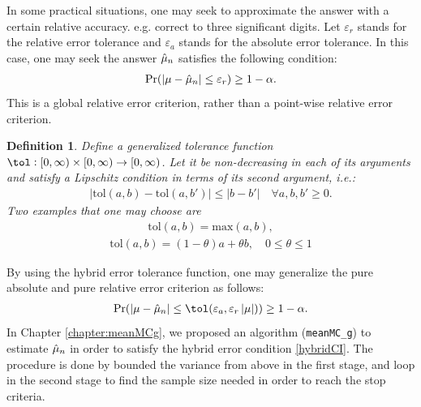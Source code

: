 \documentclass{iitthesis}
\newtheorem{defn}{Definition}[theorem]
\begin{document}
In some practical situations, one may seek to approximate the answer with a certain relative accuracy. e.g. correct to three significant digits. Let $\varepsilon_r$ stands for the relative error tolerance and $\varepsilon_a$ stands for the absolute error tolerance. In this case, one may seek the answer $\hat{\mu}_n$ satisfies the following condition:
\begin{align}\label{relCI}
\Pr(\left \lvert \mu-\hat{\mu}_n \right \rvert\leq \varepsilon_r) \geq 1-\alpha.
\end{align}
This is a global relative error criterion, rather than a point-wise relative error criterion. 
\begin{defn}\label{def:tolfun}
 Define a generalized tolerance function $\tol: [0, \infty) \times [0, \infty) \to [0,\infty)$. Let it be non-decreasing in each of its arguments and satisfy a Lipschitz condition in terms of its second argument, i.e.:
\begin{align}
|\text{tol}(a,b)-\text{tol}(a,b')| \leq |b-b'| \quad \forall a,b,b' \geq 0.
\end{align}
Two examples that one may choose are
\begin{align}
\text{tol}(a,b) = \text{max} (a,b),
\end{align}
\begin{align}
\text{tol}(a,b) = (1- \theta) a + \theta b, \quad 0 \leq \theta \leq 1
\end{align}
\end{defn}By using the hybrid error tolerance function, one may generalize the pure absolute and pure relative error criterion as follows:
\begin{align}\label{hybridCI}
\Pr(\abs{\mu-\hmu_n}\leq \tol(\varepsilon_a, \varepsilon_r\abs{\mu})) \geq 1-\alpha.
\end{align}
In Chapter \ref{chapter:meanMCg}, we proposed an algorithm ({\tt meanMC\_g}) to estimate $\hat{\mu}_n$ in order to satisfy the hybrid error condition \eqref{hybridCI}. The procedure is done by bounded the variance from above in the first stage, and loop in the second stage to find the sample size needed in order to reach the stop criteria.
\end{document}
